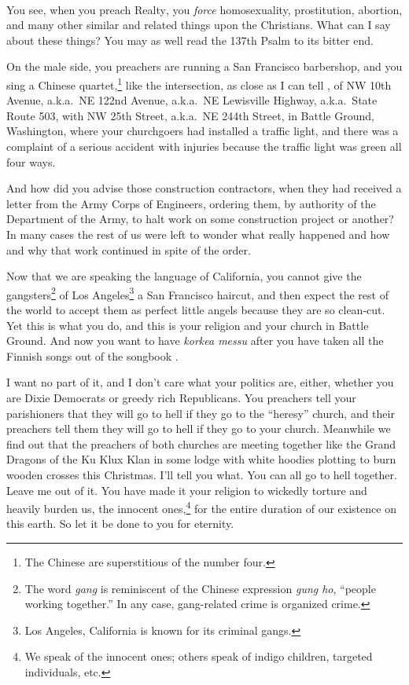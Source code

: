 \documentclass[letterpaper]{article}
\begin{document}
You see, when you preach Realty\textsuperscript\textregistered, you \textit{force} homosexuality, prostitution, abortion, and many other similar and related things upon the Christians.  What can I say about these things?  You may as well read the 137th Psalm to its bitter end.

On the male side, you preachers are running a San Francisco barbershop, and you sing a Chinese quartet,\footnote{The Chinese are superstitious of the number four.} like the intersection, as close as I can tell \cite{googlemaps2016battle}, of NW 10th Avenue, a.k.a.\ NE 122nd Avenue, a.k.a.\ NE Lewisville Highway, a.k.a.\ State Route 503, with NW 25th Street, a.k.a.\ NE 244th Street, in Battle Ground, Washington, where your churchgoers had installed a traffic light, and there was a complaint of a serious accident with injuries because the traffic light was green all four ways.

And how did you advise those construction contractors, when they had received a letter from the Army Corps of Engineers, ordering them, by authority of the Department of the Army, to halt work on some construction project or another?  In many cases the rest of us were left to wonder what really happened and how and why that work continued in spite of the order.

Now that we are speaking the language of California, you cannot give the gangsters\footnote{The word \textit{gang} is reminiscent of the Chinese expression \textit{gung ho}, ``people working together.''  In any case, gang-related crime is organized crime.} of Los Angeles\footnote{Los Angeles, California is known for its criminal gangs.} a San Francisco haircut, and then expect the rest of the world to accept them as perfect little angels because they are so clean-cut.  Yet this is what you do, and this is your religion and your church in Battle Ground.  And now you want to have \textit{korkea messu} after you have taken all the Finnish songs out of the songbook \cite{hymns}.

I want no part of it, and I don't care what your politics are, either, whether you are Dixie Democrats or greedy rich Republicans.  You preachers tell your parishioners that they will go to hell if they go to the ``heresy'' church, and their preachers tell them they will go to hell if they go to your church.  Meanwhile we find out that the preachers of both churches are meeting together like the Grand Dragons of the Ku Klux Klan in some lodge with white hoodies plotting to burn wooden crosses this Christmas.  I'll tell you what.  You can all go to hell together.  Leave me out of it.  You have made it your religion to wickedly torture and heavily burden us, the innocent ones,\footnote{We speak of the innocent ones; others speak of indigo children, targeted individuals, etc.} for the entire duration of our existence on this earth.  So let it be done to you for eternity.
\end{document}
